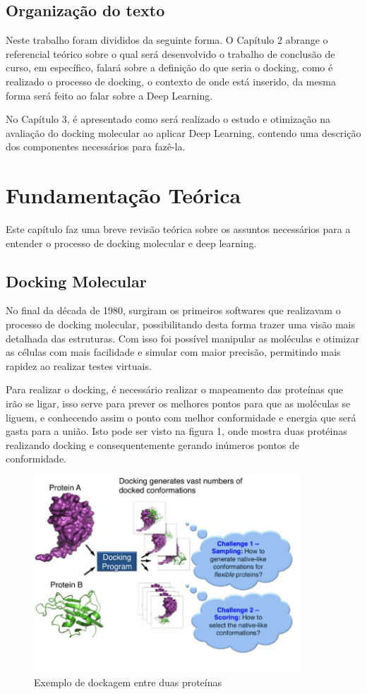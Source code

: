 \documentclass[tcc, capa]{texucpel}
\begin{document}
\section{Organização do texto}
Neste trabalho foram divididos da seguinte forma.
O Capítulo 2 abrange o referencial teórico sobre o qual será desenvolvido o trabalho de conclusão de curso, em específico, falará sobre a definição do que seria o docking, como é realizado o processo de docking, o contexto de onde está inserido, da mesma forma será feito ao falar sobre a Deep Learning.

No Capítulo 3, é apresentado como será realizado o estudo e otimização na avaliação do docking molecular ao aplicar Deep Learning, contendo uma descrição dos componentes necessários para fazê-la.

\chapter{Fundamentação Teórica}
Este capítulo faz uma breve revisão teórica sobre os assuntos necessários para a entender o processo de docking molecular  e deep learning.

\section{Docking Molecular}
No final da década de 1980, surgiram os primeiros softwares que realizavam o processo de docking molecular, possibilitando desta forma trazer uma visão mais detalhada das estruturas. Com isso foi possível manipular as moléculas e otimizar as células com mais facilidade e simular com maior precisão, permitindo mais rapidez ao realizar testes virtuais.

Para realizar o docking, é necessário realizar o mapeamento das proteínas que irão se ligar, isso serve para prever os melhores pontos para que as moléculas se liguem, e conhecendo assim o ponto com melhor conformidade e energia que será gasta para a união. Isto pode ser visto na figura 1, onde mostra duas protéinas realizando  docking e consequentemente gerando inúmeros pontos de conformidade.

      \begin{figure}[!htb]
	\centering
 \cite{xue2015protein}
    \caption{Exemplo de dockagem entre duas proteínas}
    \includegraphics[width=10cm]{imagens/mostra_docking.png}
	\end{figure}
    
\end{document}
